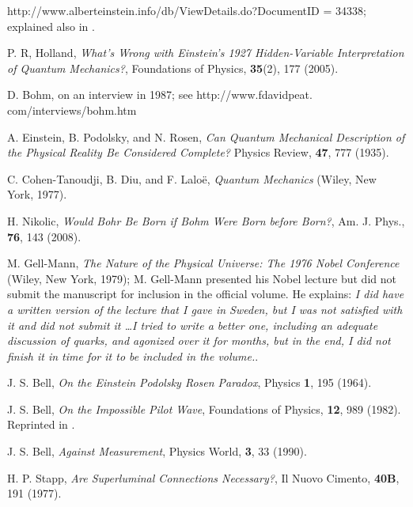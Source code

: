 \documentclass[onecolumn,nofootinbib, secnumarabic, amsmath, nobibnotes,12pt,aps,pra]{revtex4-1}
\begin{document}
\begin{thebibliography}{999}
http://www.alberteinstein.info/db/ViewDetails.do?DocumentID = 34338; explained also in \cite{om.Hollaneinstein}.

P. R, Holland, \emph{What's Wrong with Einstein's 1927 Hidden-Variable Interpretation of Quantum Mechanics?}, Foundations of Physics,
\textbf{35}(2),  177 (2005).\enlargethispage{13pt}

D. Bohm, on an interview in 1987; see http://www.fdavidpeat.  com/interviews/bohm.htm

A. Einstein, B. Podolsky, and N. Rosen, \emph{Can Quantum Mechanical Description of the Physical Reality Be Considered Complete?} Physics Review, \textbf{47},  777 (1935).

C. Cohen-Tanoudji, B. Diu, and F. Lalo\"{e}, \emph{Quantum Mechanics} (Wiley, New York, 1977).

H. Nikolic, \emph{Would Bohr Be Born if Bohm Were Born before Born?}, Am. J. Phys., \textbf{76},  143 (2008).

M. Gell-Mann, \emph{The Nature of the Physical Universe: The 1976 Nobel Conference} (Wiley, New York, 1979); M. Gell-Mann presented his Nobel lecture but did not submit the manuscript for inclusion in the official volume. He explains: \textit{I did have a written version of the lecture that I gave in Sweden, but I was not satisfied with it and did not submit it \ldots I tried to write a better one, including an adequate discussion of quarks, and agonized over it for months, but in the end, I did not finish it in time for it to be included in the volume.}.

J. S. Bell, \emph{On the Einstein Podolsky Rosen Paradox}, Physics {\bf 1},  195 (1964).

J. S. Bell, \emph{On the Impossible Pilot Wave}, Foundations of Physics, \textbf{12},  989 (1982). Reprinted in \cite{om.Bell1987}.

J. S. Bell, \emph{Against Measurement}, Physics World, \textbf{3},  33 (1990).

H. P. Stapp, \emph{Are Superluminal Connections Necessary?}, Il Nuovo Cimento, \textbf{40B},  191 (1977).


\end{thebibliography}
\end{document}
